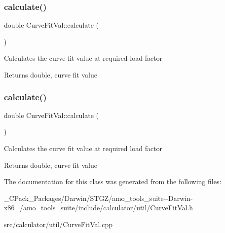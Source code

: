 \subsubsection{\texorpdfstring{calculate()}{calculate()}\hspace{0.1cm}{\footnotesize\ttfamily [2/3]}}
{\footnotesize\ttfamily double Curve\+Fit\+Val\+::calculate (\begin{DoxyParamCaption}{ }\end{DoxyParamCaption})}

Calculates the curve fit value at required load factor \begin{DoxyReturn}{Returns}
double, curve fit value 
\end{DoxyReturn}
\mbox{\label{class_curve_fit_val_ab4692d5c52b77dc03caf7b45f6377ba8}} 
\subsubsection{\texorpdfstring{calculate()}{calculate()}\hspace{0.1cm}{\footnotesize\ttfamily [3/3]}}
{\footnotesize\ttfamily double Curve\+Fit\+Val\+::calculate (\begin{DoxyParamCaption}{ }\end{DoxyParamCaption})}

Calculates the curve fit value at required load factor \begin{DoxyReturn}{Returns}
double, curve fit value 
\end{DoxyReturn}


The documentation for this class was generated from the following files\+:\begin{DoxyCompactItemize}
\item 
\+\_\+\+C\+Pack\+\_\+\+Packages/\+Darwin/\+S\+T\+G\+Z/amo\+\_\+tools\+\_\+suite-\/-\/\+Darwin-\/x86\+\_/amo\+\_\+tools\+\_\+suite/include/calculator/util/Curve\+Fit\+Val.\+h\item 
src/calculator/util/Curve\+Fit\+Val.\+cpp\end{DoxyCompactItemize}
